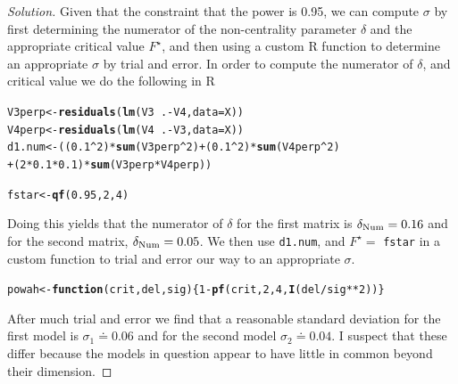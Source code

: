 \documentclass{amsart}\usepackage[]{graphicx}\usepackage[]{color}
\makeatletter
\newcommand{\hlnum}[1]{\textcolor[rgb]{0.686,0.059,0.569}{#1}}%
\newcommand{\hlopt}[1]{\textcolor[rgb]{0,0,0}{#1}}%
\newcommand{\hlstd}[1]{\textcolor[rgb]{0.345,0.345,0.345}{#1}}%
\newcommand{\hlkwa}[1]{\textcolor[rgb]{0.161,0.373,0.58}{\textbf{#1}}}%
\newcommand{\hlkwb}[1]{\textcolor[rgb]{0.69,0.353,0.396}{#1}}%
\newcommand{\hlkwc}[1]{\textcolor[rgb]{0.333,0.667,0.333}{#1}}%
\newcommand{\hlkwd}[1]{\textcolor[rgb]{0.737,0.353,0.396}{\textbf{#1}}}%
\newenvironment{kframe}{%
 \def\at@end@of@kframe{}%
 \ifinner\ifhmode%
  \def\at@end@of@kframe{\end{minipage}}%
  \begin{minipage}{\columnwidth}%
 \fi\fi%
 \def\FrameCommand##1{\hskip\@totalleftmargin \hskip-\fboxsep
 \colorbox{shadecolor}{##1}\hskip-\fboxsep
     \hskip-\linewidth \hskip-\@totalleftmargin \hskip\columnwidth}%
 \MakeFramed {\advance\hsize-\width
   \@totalleftmargin\z@ \linewidth\hsize
   \@setminipage}}%
 {\par\unskip\endMakeFramed%
 \at@end@of@kframe}
\newenvironment{knitrout}{}{} %
\makeatother
\begin{document}
		\begin{proof}[Solution]

        Given that the constraint that the power is 0.95, we can compute $\sigma$ by first determining the numerator of the non-centrality parameter $\delta$ and the appropriate critical value $F^{\star}$, and then using a custom R function to determine an appropriate $\sigma$ by trial and error.
        In order to compute the numerator of $\delta$, and critical value we do the following in R
\begin{knitrout}
\color{fgcolor}\begin{kframe}
\begin{alltt}
\hlstd{V3perp} \hlkwb{<-} \hlkwd{residuals}\hlstd{(}\hlkwd{lm}\hlstd{(V3}\hlopt{~}\hlstd{.}\hlopt{-}\hlstd{V4,} \hlkwc{data} \hlstd{= X))}
\hlstd{V4perp} \hlkwb{<-} \hlkwd{residuals}\hlstd{(}\hlkwd{lm}\hlstd{(V4}\hlopt{~}\hlstd{.}\hlopt{-}\hlstd{V3,} \hlkwc{data} \hlstd{= X))}
\hlstd{d1.num} \hlkwb{<-} \hlstd{((}\hlnum{0.1}\hlopt{^}\hlnum{2}\hlstd{)}\hlopt{*}\hlkwd{sum}\hlstd{(V3perp}\hlopt{^}\hlnum{2}\hlstd{)} \hlopt{+} \hlstd{(}\hlnum{0.1}\hlopt{^}\hlnum{2}\hlstd{)}\hlopt{*}\hlkwd{sum}\hlstd{(V4perp}\hlopt{^}\hlnum{2}\hlstd{)}
           \hlopt{+} \hlstd{(}\hlnum{2}\hlopt{*}\hlnum{0.1}\hlopt{*}\hlnum{0.1}\hlstd{)}\hlopt{*}\hlkwd{sum}\hlstd{(V3perp}\hlopt{*}\hlstd{V4perp))}

\hlstd{fstar} \hlkwb{<-} \hlkwd{qf}\hlstd{(}\hlnum{0.95}\hlstd{,} \hlnum{2}\hlstd{,} \hlnum{4}\hlstd{)}
\end{alltt}
\end{kframe}
\end{knitrout}
        Doing this yields that the numerator of $\delta$ for the first matrix is $\delta_{\rm Num} = 0.16$ and for the second matrix, $\delta_{\rm Num} = 0.05$.
        We then use \verb|d1.num|, and $F^{\star} = $ \verb|fstar| in a custom function to trial and error our way to an appropriate $\sigma$.
\begin{knitrout}
\color{fgcolor}\begin{kframe}
\begin{alltt}
\hlstd{powah} \hlkwb{<-} \hlkwa{function}\hlstd{(}\hlkwc{crit}\hlstd{,}\hlkwc{del}\hlstd{,}\hlkwc{sig}\hlstd{)\{}\hlnum{1}\hlopt{-}\hlkwd{pf}\hlstd{(crit,}\hlnum{2}\hlstd{,}\hlnum{4}\hlstd{,}\hlkwd{I}\hlstd{(del}\hlopt{/}\hlstd{sig}\hlopt{**}\hlnum{2}\hlstd{))\}}
\end{alltt}
\end{kframe}
\end{knitrout}
        After much trial and error we find that a reasonable standard deviation for the first model is $\sigma_{1} \doteq 0.06$ and for the second model $\sigma_{2} \doteq 0.04$.
        I suspect that these differ because the models in question appear to have little in common beyond their dimension.
		\end{proof}
\end{document}
